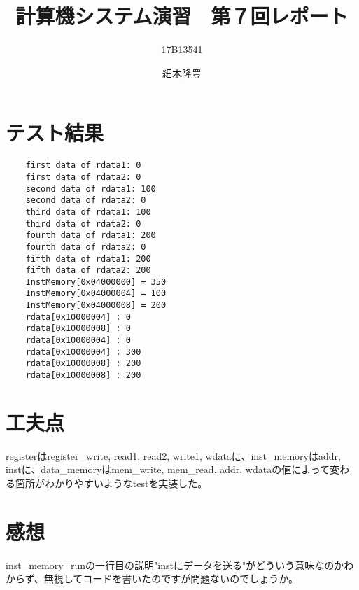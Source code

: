 \documentclass{jarticle}
\title{計算機システム演習　第７回レポート}
\author{17B13541 \and 細木隆豊}
\date{}
\begin{document}
  \maketitle
  \section{テスト結果}
  \begin{lstlisting}
    first data of rdata1: 0
    first data of rdata2: 0
    second data of rdata1: 100
    second data of rdata2: 0
    third data of rdata1: 100
    third data of rdata2: 0
    fourth data of rdata1: 200
    fourth data of rdata2: 0
    fifth data of rdata1: 200
    fifth data of rdata2: 200
    InstMemory[0x04000000] = 350
    InstMemory[0x04000004] = 100
    InstMemory[0x04000008] = 200
    rdata[0x10000004] : 0
    rdata[0x10000008] : 0
    rdata[0x10000004] : 0
    rdata[0x10000004] : 300
    rdata[0x10000008] : 200
    rdata[0x10000008] : 200
  \end{lstlisting}
  \section{工夫点}
  registerはregister\_write, read1, read2, write1, wdataに、inst\_memoryはaddr, instに、data\_memoryはmem\_write, mem\_read, addr, wdataの値によって変わる箇所がわかりやすいようなtestを実装した。
  \section{感想}
  inst\_memory\_runの一行目の説明"instにデータを送る"がどういう意味なのかわからず、無視してコードを書いたのですが問題ないのでしょうか。
\end{document}
